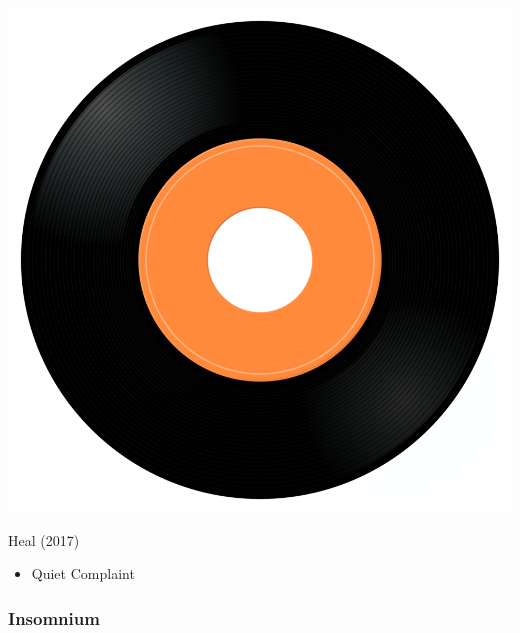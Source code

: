 \begin{minipage}[t]{0.25\textwidth}\vspace{0pt}
\captionsetup{type=figure}
\includegraphics[width=\textwidth]{Images/cover.png}
\caption*{Heal (2017)}
\end{minipage}
\begin{minipage}[t]{0.25\textwidth}\vspace{0pt}
\begin{itemize}[nosep,leftmargin=1em,labelwidth=*,align=left]
	\setlength{\itemsep}{0pt}
	\item Quiet Complaint
\end{itemize}
\end{minipage}


\subsubsection{Insomnium}

